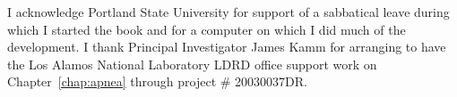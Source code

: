 \documentclass[dvips]{hmmdsbook}
\begin{document}
I acknowledge Portland State University for support of a sabbatical
leave during which I started the book and for a computer on which I
did much of the development.  I thank Principal Investigator James
Kamm for arranging to have the Los Alamos National Laboratory LDRD
office support work on Chapter~\ref{chap:apnea} through project \#
20030037DR.
%

\tableofcontents

\mainmatter







\end{document}
